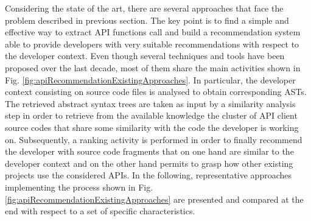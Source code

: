Considering the state of the art, there are 
several approaches that face the 
problem described in previous section. The 
key point is to find a simple and 
effective way to extract API functions call 
and build a recommendation system 
able to provide developers with very 
suitable recommendations with respect to 
the developer context. Even though several 
techniques and tools have been 
proposed over the last decade, most of them 
share the main activities shown in 
Fig. 
\ref{fig:apiRecommendationExistingApproaches}.
 In particular, the 
developer context consisting on source code 
files is analysed to obtain 
corresponding ASTs. The retrieved abstract 
syntax trees are taken as input by a 
similarity analysis step in order to 
retrieve from the available knowledge the 
cluster of API client source codes that 
share some similarity with the code the 
developer is working on. Subsequently, a 
ranking activity is performed in order 
to finally recommend the developer with 
source code fragments that on one hand 
are similar to the developer context and on 
the other hand permits to grasp how 
other existing projects use the considered 
APIs. In the following, 
representative approaches implementing the 
process shown in Fig. 
\ref{fig:apiRecommendationExistingApproaches}
 are presented and compared at the 
end with respect to a set of specific 
characteristics.





